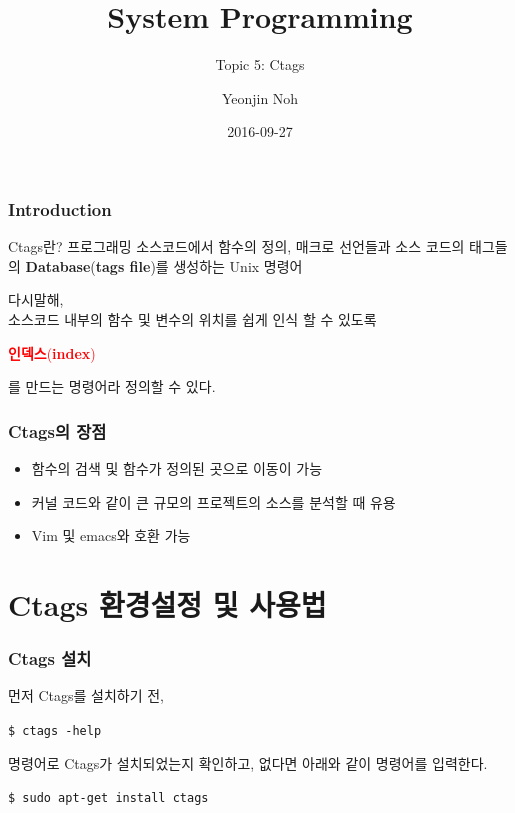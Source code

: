 \documentclass[newPxFont,sthlmFooter,nooffset]{beamer}
\title{System Programming}
\subtitle{Topic 5: Ctags}
\author[YJN]{Yeonjin Noh}
\institute{\href{mailto:nyg0813@gmail.com}{nyg0813@gmail.com}\\\url{http://esos.hanyang.ac.kr}\\Esos Lab. Hanyang University}
\date{2016-09-27}
\begin{document}
\frame[plain]{\titlepage} 




\begin{frame}[t]
  \frametitle{Introduction}
\begin{block}{Ctags란?}
\medskip
프로그래밍 소스코드에서 함수의 정의, 매크로 선언들과 소스 코드의 태그들의 \textbf{Database}(\textbf{tags file})를 생성하는 Unix 명령어
\end{block}
\smallskip
다시말해, \\
\bigskip
소스코드 내부의 함수 및 변수의 위치를 쉽게 인식 할 수 있도록\\ 
\begin{Large}
\textcolor{red}{\textbf{인덱스}(\textbf{index})}
\end{Large}를 만드는 명령어라 정의할 수 있다.
\end{frame}
\begin{frame}[t]
  \frametitle{Ctags의 장점}
\begin{itemize}
\item 함수의 검색 및 함수가 정의된 곳으로 이동이 가능
\item 커널 코드와 같이 큰 규모의 프로젝트의 소스를 분석할 때 유용
\item Vim 및 emacs와 호환 가능
\end{itemize}
\end{frame}
\section{Ctags 환경설정 및 사용법}
\begin{frame}[containsverbatim, t]
  \frametitle{Ctags 설치}
먼저 Ctags를 설치하기 전, 
\begin{mdframed}[backgroundcolor=lightgray,hidealllines=true]
\texttt{\textcolor[rgb]{0,0,0}{\$ ctags -help}}
\end{mdframed}
\bigskip
명령어로 Ctags가 설치되었는지 확인하고, 없다면 아래와 같이 명령어를 입력한다.
\begin{mdframed}[backgroundcolor=lightgray,hidealllines=true]
\texttt{\textcolor[rgb]{0,0,0}{\$ sudo apt-get install ctags}}
\end{mdframed}
\bigskip
\end{frame}
\end{document}
